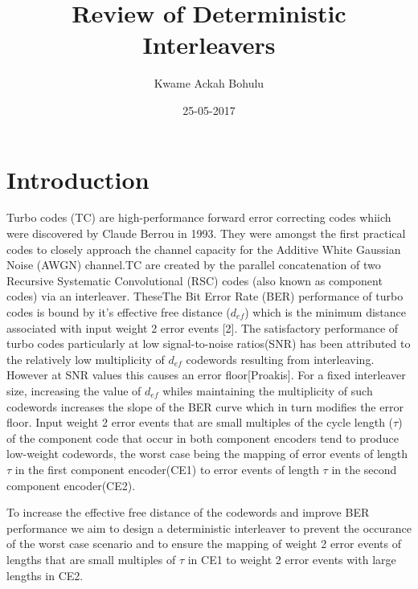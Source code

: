 \documentclass[20 pts]{article}
\title{Review of Deterministic Interleavers}
\author{Kwame Ackah Bohulu}
\date{25-05-2017}
\begin{document}
\maketitle


\section{Introduction}
Turbo codes (TC) are high-performance forward error correcting codes whiich were discovered by Claude Berrou in 1993. They were amongst the first practical codes to closely approach the channel capacity for the Additive White Gaussian Noise (AWGN) channel.TC are created by the parallel concatenation of two Recursive Systematic Convolutional (RSC) codes (also known as component codes) via an interleaver. TheseThe Bit Error Rate (BER) performance of turbo codes is bound by it's effective free distance ($d_{ef}$) which is the minimum distance associated with input weight 2 error events [2]. The satisfactory performance of turbo codes particularly at low signal-to-noise ratios(SNR) has been attributed to the relatively low multiplicity of $d_{ef}$ codewords resulting from interleaving. However at SNR values this causes an error floor[Proakis]. For a fixed interleaver size, increasing the value of $d_{ef}$ whiles maintaining the multiplicity of such codewords increases the slope of the BER curve which in turn modifies the error floor.
Input weight 2 error events that are small multiples of the cycle length ($\tau$) of the component code that occur in both component encoders tend to produce low-weight codewords, the worst case being the mapping of error events of length $\tau$ in the first component encoder(CE1) to error events of length $\tau$ in the second component encoder(CE2).  

To increase the effective free distance of the codewords and improve BER performance we aim to design a deterministic interleaver to prevent the occurance of the worst case scenario and to ensure the mapping of weight 2 error events of lengths that are small multiples of $\tau$ in CE1 to weight 2 error events with large lengths in CE2. 
\end{document}
